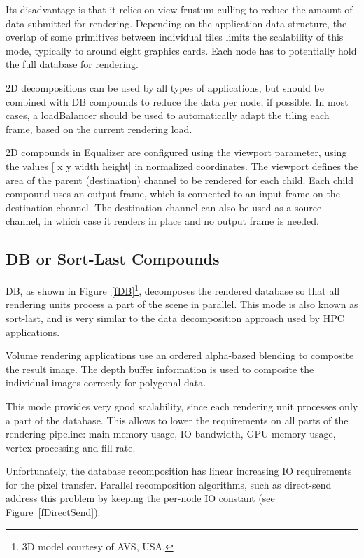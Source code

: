 \documentclass[10pt,a4]{scrartcl}
\newcommand{\fig}[1]{Figure~\ref{#1}}
\begin{document}
Its disadvantage is that it relies on view frustum culling to reduce the
amount of data submitted for rendering. Depending on the application
data structure, the overlap of some primitives between individual tiles
limits the scalability of this mode, typically to around eight graphics
cards. Each node has to potentially hold the full database for
rendering.

2D decompositions can be used by all types of applications, but should
be combined with DB compounds to reduce the data per node, if
possible. In most cases, a \textsf{loadBalancer} should be used to
automatically adapt the tiling each frame, based on the current
rendering load.

2D compounds in Equalizer are configured using the \textsf{viewport}
parameter, using the values \textsf{[ x y width height]} in normalized
coordinates. The viewport defines the area of the parent (destination)
channel to be rendered for each child. Each child compound uses an
output frame, which is connected to an input frame on the destination
channel. The destination channel can also be used as a source channel,
in which case it renders in place and no output frame is needed.

\subsection{DB or Sort-Last Compounds}

DB, as shown in \fig{fDB}\footnote{3D model courtesy of AVS, USA.},
decomposes the rendered database so that all rendering units process a
part of the scene in parallel. This mode is also known as sort-last, and
is very similar to the data decomposition approach used by HPC
applications.

Volume rendering applications use an ordered alpha-based blending to
composite the result image. The depth buffer information is used to
composite the individual images correctly for polygonal data. 

This mode provides very good scalability, since each rendering unit
processes only a part of the database. This allows to lower the
requirements on all parts of the rendering pipeline: main memory usage,
IO bandwidth, GPU memory usage, vertex processing and fill rate.

Unfortunately, the database recomposition has linear increasing IO
requirements for the pixel transfer. Parallel recomposition algorithms,
such as direct-send address this problem by keeping the per-node IO
constant (see \fig{fDirectSend}).
\end{document}
